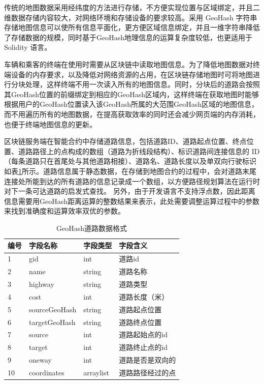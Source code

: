 传统的地图数据采用经纬度的方法进行存储，不方便实现位置与区域绑定，并且二维数据存储内容较大，对网络环境和存储设备的要求较高。采用 GeoHash 字符串存储地图信息可以使所有信息平面化，更方便区域信息绑定，并且一维字符串降低了存储数据的规模，同时基于GeoHash地理信息的运算复杂度较低，也更适用于 Solidity 语言。

车辆和乘客的终端在使用时需要从区块链中读取地图信息。为了降低地图数据对终端设备的内存要求，以及降低对网络资源的占用，在区块链存储地图时可将地图进行分块处理，这样终端不用一次读入所有的地图信息。同时，分块后的道路会按照其GeoHash位置的前缀绑定到相应的GeoHash区域内，这样终端在获取地图时能够根据用户的GeoHash位置读入该GeoHash所属的大范围GeoHash区域的地图信息，而不用遍历所有的地图数据，在提高获取效率的同时还会减少网页端的内存消耗，也便于终端地图信息的更新。

区块链服务端在智能合约中存储道路信息，包括道路ID、道路起点位置、终点位置、道路路径上的点构成的数组（道路为折线段结构）、标识道路间连接信息的 ID（每条道路只在首尾处与其他道路相接）、道路名、道路长度以及单双向行驶标识如表\ref{tab:roadFormat}所示。道路信息属于静态数据，在存储到地图合约的过程中，会对道路末尾连接处所能到达的所有道路的信息记录成一个数组，以方便路径规划算法在运行时对下一条可达道路的启发式查找。
另外，由于开发语言不支持浮点数，因此距离信息需要用GeoHash距离运算的整数结果来表示，此处需要调整运算过程中的参数来找到准确度和运算效率双优的参数。

\begin{table}
  \centering
  \caption{GeoHash道路数据格式}\label{tab:roadFormat}
  \begin{tabular*}{0.9\textwidth}{@{\extracolsep{\fill}}llll}
  \toprule
    编号    &字段名称 &字段类型 &字段含义 \\
  \midrule
    1    &gid &int &道路id\\
    2    &name &string &道路名称\\
    3    &highway &string &道路类型\\
    4    &cost &int &道路长度（米）\\
    5    &sourceGeoHash &string &道路起点位置\\
    6    &targetGeoHash &string &道路终点位置\\
    7    &source &int &道路起始点的id\\
    8    &target &int &道路终止点的id\\
    9    &oneway &int &道路是否是双向的\\
    10    &coordinates &arraylist &道路路径经过的点\\
  \bottomrule
  \end{tabular*}
\end{table}

